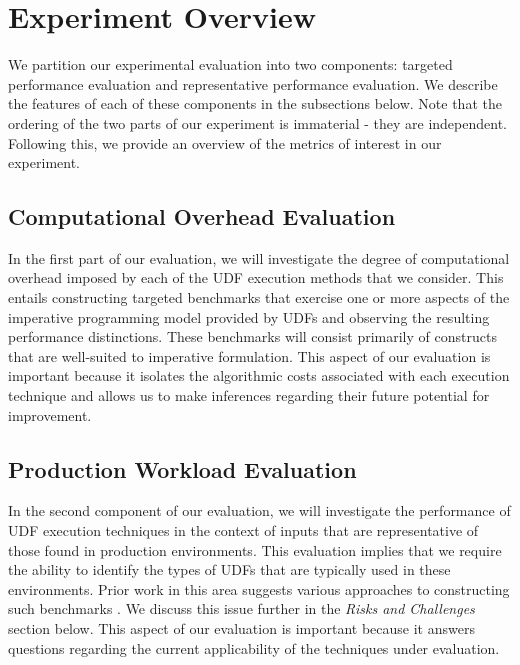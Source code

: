 \documentclass{vldb}
\begin{document}

\section{Experiment Overview}

We partition our experimental evaluation into two components: targeted performance evaluation and representative performance evaluation. We describe the features of each of these components in the subsections below. Note that the ordering of the two parts of our experiment is immaterial - they are independent. Following this, we provide an overview of the metrics of interest in our experiment.

\subsection{Computational Overhead Evaluation}

In the first part of our evaluation, we will investigate the degree of computational overhead imposed by each of the UDF execution methods that we consider. This entails constructing targeted benchmarks that exercise one or more aspects of the imperative programming model provided by UDFs and observing the resulting performance distinctions. These benchmarks will consist primarily of constructs that are well-suited to imperative formulation. This aspect of our evaluation is important because it isolates the algorithmic costs associated with each execution technique and allows us to make inferences regarding their future potential for improvement.

\subsection{Production Workload Evaluation}

In the second component of our evaluation, we will investigate the performance of UDF execution techniques in the context of inputs that are representative of those found in production environments. This evaluation implies that we require the ability to identify the types of UDFs that are typically used in these environments. Prior work in this area suggests various approaches to constructing such benchmarks \cite{tanuj, froid}. We discuss this issue further in the \textit{Risks and Challenges} section below. This aspect of our evaluation is important because it answers questions regarding the current applicability of the techniques under evaluation.
\end{document}
